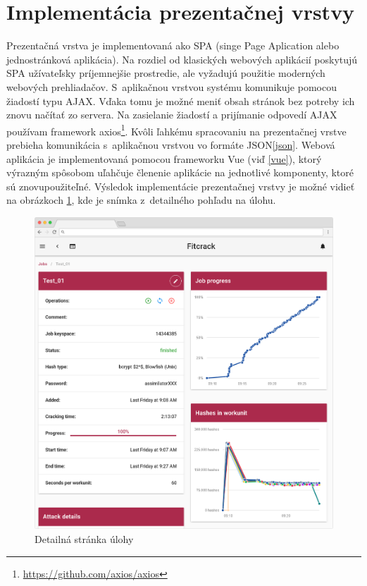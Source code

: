 \documentclass[slovak]{fitthesis}
\begin{document}
\section{Implementácia prezentačnej vrstvy}


Prezentačná vrstva je implementovaná ako SPA (singe Page Aplication alebo jednostránková aplikácia). Na rozdiel od klasických webových aplikácií poskytujú SPA užívateľsky príjemnejšie prostredie, ale vyžadujú použitie moderných webových prehliadačov. S~aplikačnou vrstvou systému komunikuje pomocou žiadostí typu AJAX. Vďaka tomu je možné meniť obsah stránok bez potreby ich znovu načítať zo servera. Na zasielanie žiadostí a prijímanie odpovedí AJAX používam framework axios\footnote{\url{https://github.com/axios/axios}}. Kvôli ľahkému spracovaniu na prezentačnej vrstve prebieha komunikácia s~aplikačnou vrstvou vo formáte JSON\ref{json}. Webová aplikácia je implementovaná pomocou frameworku Vue (viď \ref{vue}), ktorý výrazným spôsobom uľahčuje členenie aplikácie na jednotlivé komponenty, ktoré sú znovupoužiteľné. Výsledok implementácie prezentačnej vrstvy je možné vidieť na obrázkoch \ref{fig:detailPage}, kde je snímka z~detailného pohľadu na úlohu.
\begin{figure}[H]
    \centering
    \includegraphics[scale=0.25]{obrazky/jobDetail2Frame.PNG}
    \caption{Detailná stránka úlohy}
    \label{fig:detailPage}
\end{figure}
\end{document}
